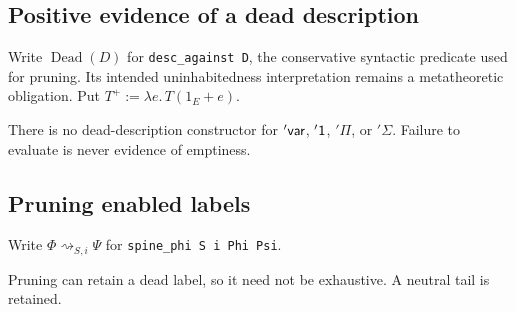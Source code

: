 \subsection{Positive evidence of a dead description}
Write $\operatorname{Dead}(D)$ for \texttt{desc\_against D}, the conservative syntactic predicate used for pruning. Its intended uninhabitedness interpretation remains a metatheoretic obligation. Put $T^+:=\lambda e.\,T(1_E+e)$.
There is no dead-description constructor for $\mathsf{'var}$, $\mathsf{'1}$, $'\Pi$, or $'\Sigma$. Failure to evaluate is never evidence of emptiness.

\subsection{Pruning enabled labels}
Write $\Phi\rightsquigarrow_{S,i}\Psi$ for \texttt{spine\_phi S i Phi Psi}.
Pruning can retain a dead label, so it need not be exhaustive. A neutral tail is retained.

